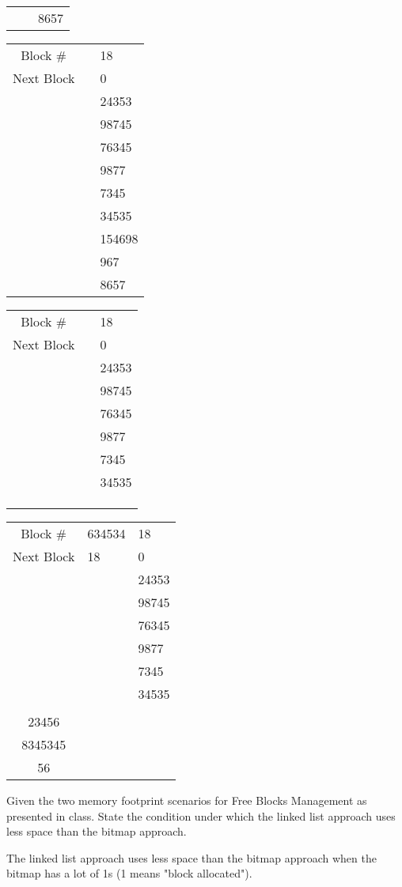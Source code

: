 \documentclass[a4paper,11pt]{exam}
\begin{document}
\begin{questions}
\begin{tabular}{|c|p{3.25em}|p{3.25em}|}
	&  & 8657 \\ \cline{1-3}
\end{tabular}
\begin{tabular}{|c|p{3.25em}|p{3.25em}|}
\hline
Block \# & & 18 \\ \cline{1-3}
Next Block & & 0 \\ \cline{1-3}
\multirow{5}{*}{} & & 24353 \\ \cline{2-3}
	&  & 98745 \\ \cline{2-3}
	&  & 76345 \\ \cline{2-3}
	&  & 9877 \\ \cline{2-3}
	&  & 7345 \\ \cline{2-3}
	&  & 34535 \\ \cline{2-3}
	&  & 154698 \\ \cline{2-3}
	&  & 967 \\ \cline{2-3}
	&  & 8657 \\ \cline{1-3}
\end{tabular}

\begin{tabular}{|c|p{3.25em}|p{3.25em}|}
\hline
Block \# & & 18 \\ \cline{1-3}
Next Block & & 0 \\ \cline{1-3}
\multirow{5}{*}{} & & 24353 \\ \cline{2-3}
	&  & 98745 \\ \cline{2-3}
	&  & 76345 \\ \cline{2-3}
	&  & 9877 \\ \cline{2-3}
	&  & 7345 \\ \cline{2-3}
	&  & 34535 \\ \cline{2-3}
	&  &  \\ \cline{2-3}
	&  &  \\ \cline{2-3}
	&  &  \\ \cline{1-3}
\end{tabular}
\begin{tabular}{|c|p{3.25em}|p{3.25em}|}
\hline
Block \# & 634534 & 18 \\ \cline{1-3}
Next Block & 18 & 0 \\ \cline{1-3}
\multirow{5}{*}{} &  & 24353 \\ \cline{2-3}
	&  & 98745 \\ \cline{2-3}
	&  & 76345 \\ \cline{2-3}
	&  & 9877 \\ \cline{2-3}
	&  & 7345 \\ \cline{2-3}
	&  & 34535 \\ \cline{2-3}
	&  &  \\ 23456 \cline{2-3}
	&  &  \\ 8345345 \cline{2-3}
	&  &  \\ 56 \cline{1-3}
\end{tabular}
Given the two memory footprint scenarios for Free Blocks Management as presented in class. State the condition under which the linked list approach uses less space than the bitmap approach.


The linked list approach uses less space than the bitmap approach when the bitmap has a lot of 1s (1 means "block allocated"). 
\end{questions}
\end{document}
